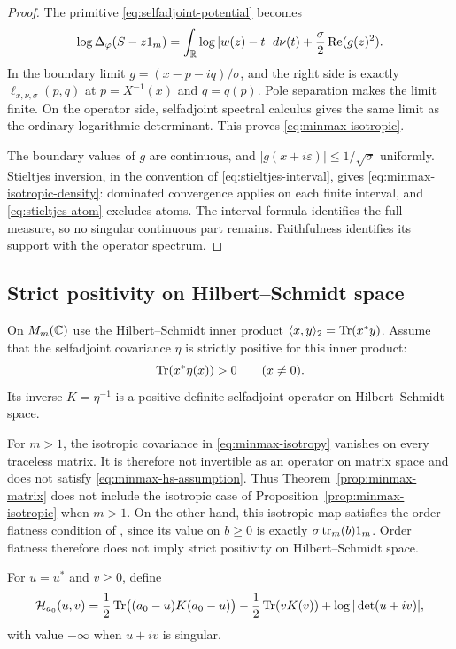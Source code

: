 \begin{proof}
The primitive \eqref{eq:selfadjoint-potential} becomes
\begin{equation}\label{eq:minmax-isotropic-primitive}
 \log\Delta_\varphi(S-z1_m)
 =\int_\mathbb R\log|w(z)-t|\,\,d\nu(t)
       +\frac\sigma2\operatorname{Re}(g(z)^2).
\end{equation}
In the boundary limit $g=(x-p-iq)/\sigma$, and the right side is exactly $\ell_{x,\nu,\sigma}(p,q)$ at $p=X^{-1}(x)$ and $q=q(p)$.
Pole separation makes the limit finite.
On the operator side, selfadjoint spectral calculus gives the same limit as the ordinary logarithmic determinant.
This proves \eqref{eq:minmax-isotropic}.

The boundary values of $g$ are continuous, and $|g(x+i\varepsilon)|\le1/\sqrt\sigma$ uniformly.
Stieltjes inversion, in the convention of \eqref{eq:stieltjes-interval}, gives \eqref{eq:minmax-isotropic-density}: dominated convergence applies on each finite interval, and \eqref{eq:stieltjes-atom} excludes atoms.
The interval formula identifies the full measure, so no singular continuous part remains.
Faithfulness identifies its support with the operator spectrum.
\end{proof}

\subsection{Strict positivity on Hilbert--Schmidt space}

On $M_m(\mathbb C)$ use the Hilbert--Schmidt inner product $\langle x,y\rangle_2=\operatorname{Tr}(x^*y)$.
Assume that the selfadjoint covariance $\eta$ is strictly positive for this inner product:
\begin{equation}\label{eq:minmax-hs-assumption}
 \operatorname{Tr}(x^*\eta(x))>0\qquad(x\ne0).
\end{equation}
Its inverse $K=\eta^{-1}$ is a positive definite selfadjoint operator on Hilbert--Schmidt space.

\begin{remark}\label{rem:minmax-domains}
For $m>1$, the isotropic covariance in \eqref{eq:minmax-isotropy} vanishes on every traceless matrix.
It is therefore not invertible as an operator on matrix space and does not satisfy \eqref{eq:minmax-hs-assumption}.
Thus Theorem~\ref{prop:minmax-matrix} does not include the isotropic case of Proposition~\ref{prop:minmax-isotropic} when $m>1$.
On the other hand, this isotropic map satisfies the order-flatness condition of \cite[Assumption A1]{AEK19}, since its value on $b\ge0$ is exactly $\sigma\operatorname{tr}_m(b)1_m$.
Order flatness therefore does not imply strict positivity on Hilbert--Schmidt space.
\end{remark}
For $u=u^*$ and $v\ge0$, define
\begin{equation}\label{eq:minmax-matrix-action}
 \mathcal H_{a_0}(u,v)
 =\frac12\operatorname{Tr}\bigl((a_0-u)K(a_0-u)\bigr)
  -\frac12\operatorname{Tr}(vK(v))+\log|\det(u+iv)|,
\end{equation}
with value $-\infty$ when $u+iv$ is singular.

